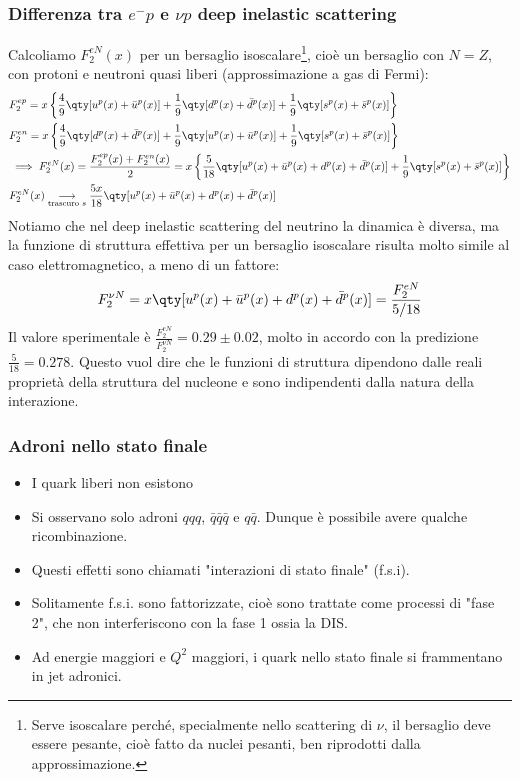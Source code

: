 \subsubsection{Differenza tra $e^-p$ e $\nu p$ deep inelastic scattering}
Calcoliamo $F_2^{eN}(x)$ per un bersaglio isoscalare\footnote{Serve isoscalare perché, specialmente nello scattering di $\nu$, il bersaglio deve essere pesante, cioè fatto da nuclei pesanti, ben riprodotti dalla approssimazione.}, cioè un bersaglio con $N=Z$, con protoni e neutroni quasi liberi (approssimazione a gas di Fermi):
\begin{align*}
&F_2^{ep}=x\left\{\frac{4}{9}\qty[u^p(x)+\bar u^p(x)]+\frac{1}{9}\qty[d^p(x)+\bar d^p(x)]+\frac{1}{9}\qty[s^p(x)+\bar s^p(x)] \right\}\\
&F_2^{en}=x\left\{\frac{4}{9}\qty[d^p(x)+\bar d^p(x)]+\frac{1}{9}\qty[u^p(x)+\bar u^p(x)]+\frac{1}{9}\qty[s^p(x)+\bar s^p(x)] \right\}\\
&\implies F_2^{eN}(x)=\frac{F_2^{ep}(x)+F_2^{en}(x)}2=x\left\{\frac{5}{18}\qty[u^p(x)+\bar u^p(x)+d^p(x)+\bar d^p(x)]+\frac{1}{9}\qty[s^p(x)+\bar s^p(x)] \right\}\\
&F_2^{eN}(x)\underset{\textnormal{trascuro }s}{\longrightarrow}\frac{5x}{18}\qty[u^p(x)+\bar u^p(x)+d^p(x)+\bar d^p(x)]
\end{align*}
Notiamo che nel deep inelastic scattering del neutrino la dinamica è diversa, ma la funzione di struttura effettiva per un bersaglio isoscalare risulta molto simile al caso elettromagnetico, a meno di un fattore:
\begin{equation*}
F_2^{\nu N}=x\qty[u^p(x)+\bar u^p(x)+d^p(x)+\bar d^p(x)]=\frac{F_2^{eN}}{5/18}
\end{equation*}
Il valore sperimentale è $\frac{F_2^{eN}}{F_2^{\nu N}}=0.29\pm0.02$, molto in accordo con la predizione $\frac{5}{18}=0.278$. Questo vuol dire che le funzioni di struttura dipendono dalle reali proprietà della struttura del nucleone e sono indipendenti dalla natura della interazione.
\subsubsection{Adroni nello stato finale}
\begin{itemize}
    \item I quark liberi non esistono
    \item Si osservano solo adroni $qqq$, $\bar q\bar q\bar q$ e $q\bar q$. Dunque è possibile avere qualche ricombinazione.
    \item Questi effetti sono chiamati "interazioni di stato finale" (f.s.i).
    \item Solitamente f.s.i. sono fattorizzate, cioè sono trattate come processi di "fase 2", che non interferiscono con la fase 1 ossia la DIS.
    \item Ad energie maggiori e $Q^2$ maggiori, i quark nello stato finale si frammentano in jet adronici.
\end{itemize}
